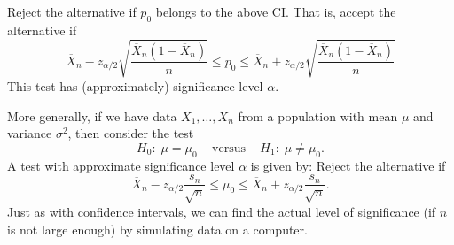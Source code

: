 \documentclass[preprint,  11pt]{amsart}
\theoremstyle{plain} %
\theoremstyle{definition} %
\begin{document}
Reject the alternative if $p_{0}$ belongs to the above CI. That is, accept the alternative if
$$
\overline{X}_{n}-z_{\alpha/2}\sqrt{\frac{\overline{X}_{n}(1-\overline{X}_{n})}{n}}\le p_{0}\le \overline{X}_{n}+z_{\alpha/2}\sqrt{\frac{\overline{X}_{n}(1-\overline{X}_{n})}{n}}
$$
This test has (approximately) significance level $\alpha$.

\medskip
More generally, if we have data $X_{1},\ldots ,X_{n}$ from a population with mean $\mu$ and variance ${\sigma}^{2}$, then consider the test
$$
H_{0}: \; \mu=\mu_{0} \;\;\; \mbox{ versus }\;\;\; H_{1}: \; \mu\not=\mu_{0}.
$$
A test with approximate significance level $\alpha$ is given by: Reject the alternative if
$$
\overline{X}_{n}-z_{\alpha/2}\frac{s_{n}}{\sqrt{n}}\le \mu_{0}\le \overline{X}_{n}+z_{\alpha/2}\frac{s_{n}}{\sqrt{n}}.
$$
Just as with confidence intervals, we can find the actual level of significance (if $n$ is not large enough) by simulating data on a computer.


\end{document}
